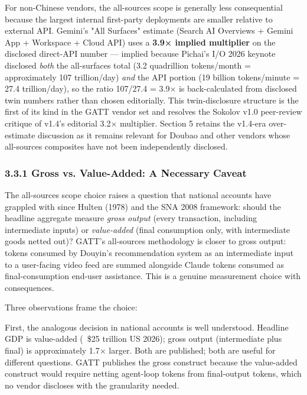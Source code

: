\documentclass[11pt,a4paper]{article}
\begin{document}
For non-Chinese vendors, the all-sources scope is generally less consequential because the largest internal first-party deployments are smaller relative to external API. Gemini's "All Surfaces" estimate (Search AI Overviews + Gemini App + Workspace + Cloud API) uses a \textbf{3.9× implied multiplier} on the disclosed direct-API number --- implied because Pichai's I/O 2026 keynote \cite{pichai2026io} disclosed \emph{both} the all-surfaces total (3.2 quadrillion tokens/month = approximately 107 trillion/day) \emph{and} the API portion (19 billion tokens/minute = 27.4 trillion/day), so the ratio 107/27.4 = 3.9× is back-calculated from disclosed twin numbers rather than chosen editorially. This twin-disclosure structure is the first of its kind in the GATT vendor set and resolves the Sokolov v1.0 peer-review critique of v1.4's editorial 3.2× multiplier. Section 5 retains the v1.4-era over-estimate discussion as it remains relevant for Doubao and other vendors whose all-sources composites have not been independently disclosed.

\subsubsection{3.3.1 Gross vs. Value-Added: A Necessary Caveat}

The all-sources scope choice raises a question that national accounts have grappled with since Hulten (1978) and the SNA 2008 framework: should the headline aggregate measure \emph{gross output} (every transaction, including intermediate inputs) or \emph{value-added} (final consumption only, with intermediate goods netted out)? GATT's all-sources methodology is closer to gross output: tokens consumed by Douyin's recommendation system as an intermediate input to a user-facing video feed are summed alongside Claude tokens consumed as final-consumption end-user assistance. This is a genuine measurement choice with consequences.

Three observations frame the choice:

First, the analogous decision in national accounts is well understood. Headline GDP is value-added (~\$25 trillion US 2026); gross output (intermediate plus final) is approximately 1.7× larger. Both are published; both are useful for different questions. GATT publishes the gross construct because the value-added construct would require netting agent-loop tokens from final-output tokens, which no vendor discloses with the granularity needed.
\end{document}
